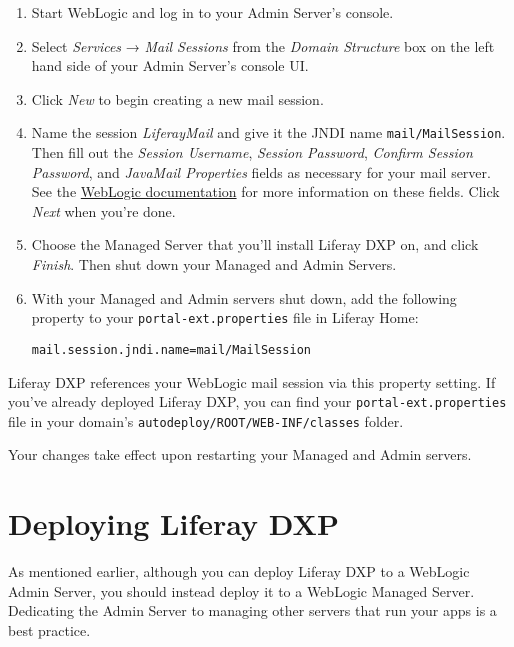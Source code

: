 \begin{enumerate}
\def\labelenumi{\arabic{enumi}.}
\item
  Start WebLogic and log in to your Admin Server's console.
\item
  Select \emph{Services} → \emph{Mail Sessions} from the \emph{Domain
  Structure} box on the left hand side of your Admin Server's console
  UI.
\item
  Click \emph{New} to begin creating a new mail session.
\item
  Name the session \emph{LiferayMail} and give it the JNDI name
  \texttt{mail/MailSession}. Then fill out the \emph{Session Username},
  \emph{Session Password}, \emph{Confirm Session Password}, and
  \emph{JavaMail Properties} fields as necessary for your mail server.
  See the
  \href{http://docs.oracle.com/middleware/1221/wls/FMWCH/pagehelp/Mailcreatemailsessiontitle.html}{WebLogic
  documentation} for more information on these fields. Click \emph{Next}
  when you're done.
\item
  Choose the Managed Server that you'll install Liferay DXP on, and
  click \emph{Finish}. Then shut down your Managed and Admin Servers.
\item
  With your Managed and Admin servers shut down, add the following
  property to your \texttt{portal-ext.properties} file in Liferay Home:

\begin{verbatim}
mail.session.jndi.name=mail/MailSession
\end{verbatim}
\end{enumerate}

Liferay DXP references your WebLogic mail session via this property
setting. If you've already deployed Liferay DXP, you can find your
\texttt{portal-ext.properties} file in your domain's
\texttt{autodeploy/ROOT/WEB-INF/classes} folder.

Your changes take effect upon restarting your Managed and Admin servers.

\section{Deploying Liferay DXP}\label{deploying-liferay-dxp-3}

As mentioned earlier, although you can deploy Liferay DXP to a WebLogic
Admin Server, you should instead deploy it to a WebLogic Managed Server.
Dedicating the Admin Server to managing other servers that run your apps
is a best practice.

